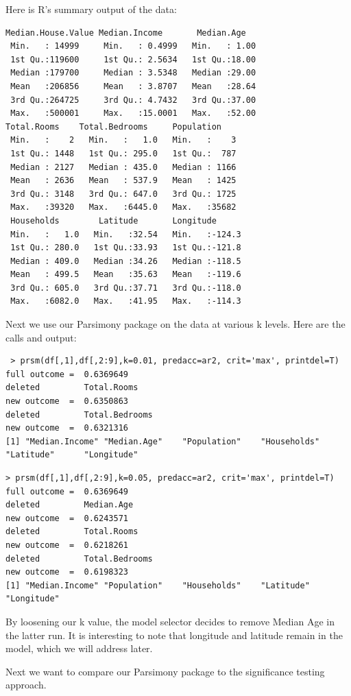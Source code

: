 \documentclass[letter]{article}
\begin{document}
Here is R's summary output of the data:
\begin{verbatim}
Median.House.Value Median.Income       Median.Age   
 Min.   : 14999     Min.   : 0.4999   Min.   : 1.00  
 1st Qu.:119600     1st Qu.: 2.5634   1st Qu.:18.00  
 Median :179700     Median : 3.5348   Median :29.00  
 Mean   :206856     Mean   : 3.8707   Mean   :28.64  
 3rd Qu.:264725     3rd Qu.: 4.7432   3rd Qu.:37.00  
 Max.   :500001     Max.   :15.0001   Max.   :52.00
Total.Rooms    Total.Bedrooms     Population   
 Min.   :    2   Min.   :   1.0   Min.   :    3  
 1st Qu.: 1448   1st Qu.: 295.0   1st Qu.:  787  
 Median : 2127   Median : 435.0   Median : 1166  
 Mean   : 2636   Mean   : 537.9   Mean   : 1425  
 3rd Qu.: 3148   3rd Qu.: 647.0   3rd Qu.: 1725  
 Max.   :39320   Max.   :6445.0   Max.   :35682
 Households        Latitude       Longitude     
 Min.   :   1.0   Min.   :32.54   Min.   :-124.3  
 1st Qu.: 280.0   1st Qu.:33.93   1st Qu.:-121.8  
 Median : 409.0   Median :34.26   Median :-118.5  
 Mean   : 499.5   Mean   :35.63   Mean   :-119.6  
 3rd Qu.: 605.0   3rd Qu.:37.71   3rd Qu.:-118.0  
 Max.   :6082.0   Max.   :41.95   Max.   :-114.3  
 \end{verbatim}

 
 Next we use our Parsimony package on the data at various k levels. Here are the calls and output:
\begin{verbatim}
 > prsm(df[,1],df[,2:9],k=0.01, predacc=ar2, crit='max', printdel=T)
full outcome =  0.6369649 
deleted         Total.Rooms 
new outcome  =  0.6350863 
deleted         Total.Bedrooms 
new outcome  =  0.6321316 
[1] "Median.Income" "Median.Age"    "Population"    "Households"    "Latitude"      "Longitude"
\end{verbatim}
\begin{verbatim}
> prsm(df[,1],df[,2:9],k=0.05, predacc=ar2, crit='max', printdel=T)
full outcome =  0.6369649 
deleted         Median.Age 
new outcome  =  0.6243571 
deleted         Total.Rooms 
new outcome  =  0.6218261 
deleted         Total.Bedrooms 
new outcome  =  0.6198323 
[1] "Median.Income" "Population"    "Households"    "Latitude"      "Longitude"
 \end{verbatim}
By loosening our k value, the model selector decides to remove Median Age in the latter run. It is interesting to note that longitude and latitude remain in the model, which we will address later.

Next we want to compare our Parsimony package to the significance testing approach. 
\end{document}
